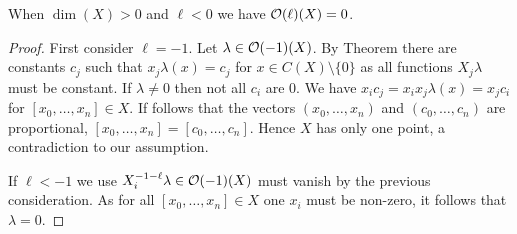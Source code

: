 \documentclass[a4paper,parskip=half,numbers=enddot, DIV=12, headheight=30pt]{scrreprt}
\begin{document}
\begin{cor}
    When $\dim(X) >0$ and $\ell<0$ we have $\mathcal{O}(\ell)(X) = 0$.
\end{cor}
\begin{proof}
    First consider $\ell=-1$. Let $\lambda\in \mathcal{O}(-1)(X)$. By Theorem  there are constants $c_j$ such that $x_j \lambda(x) = c_j$ for $x\in C(X)\setminus\{0\}$ as all functions $X_j\lambda$ must be constant. If $\lambda\neq 0$ then not all $c_i$ are $0$. We have $x_ic_j = x_ix_j\lambda(x) = x_jc_i$ for $[x_0,\ldots, x_n]\in X$. If follows that the vectors $(x_0,\ldots, x_n)$ and $(c_0,\ldots, c_n)$ are proportional, $[x_0,\ldots, x_n] = [c_0,\ldots, c_n]$. Hence $X$ has only one point, a contradiction to our assumption. 
    
    If $\ell<-1$ we use $X_i^{-1-\ell}\lambda\in \mathcal{O}(-1)(X)$ must vanish by the previous consideration. As for all $[x_0,\ldots,x_n]\in X$ one $x_i$ must be non-zero, it follows that $\lambda = 0$.
\end{proof}
\end{document}
